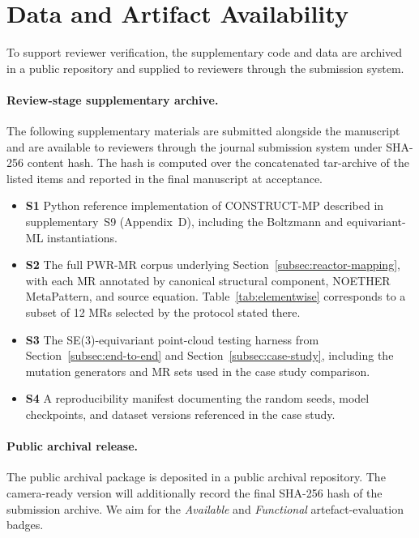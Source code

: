 \documentclass[acmsmall,screen,review]{acmart}
\begin{document}
\section{Data and Artifact Availability}
\label{subsec:artefact}

To support reviewer verification, the supplementary code and data are archived
in a public repository and supplied to reviewers through the submission system.

\paragraph{Review-stage supplementary archive.} The following supplementary materials are submitted alongside the manuscript and are available to reviewers through the journal submission system under SHA-256 content hash. The hash is computed over the concatenated tar-archive of the listed items and reported in the final manuscript at acceptance.
\begin{itemize}
    \item \textbf{S1} Python reference implementation of CONSTRUCT-MP described in supplementary~S9 (Appendix~D), including the Boltzmann and equivariant-ML instantiations.
    \item \textbf{S2} The full PWR-MR corpus underlying Section~\ref{subsec:reactor-mapping}, with each MR annotated by canonical structural component, NOETHER MetaPattern, and source equation. Table~\ref{tab:elementwise} corresponds to a subset of 12 MRs selected by the protocol stated there.
    \item \textbf{S3} The SE(3)-equivariant point-cloud testing harness from Section~\ref{subsec:end-to-end} and Section~\ref{subsec:case-study}, including the mutation generators and MR sets used in the case study comparison.
    \item \textbf{S4} A reproducibility manifest documenting the random seeds, model checkpoints, and dataset versions referenced in the case study.
\end{itemize}

\paragraph{Public archival release.} The public archival package is deposited
in a public archival repository. The camera-ready version will additionally record the final SHA-256 hash of the
submission archive. We aim for the \emph{Available} and \emph{Functional}
artefact-evaluation badges.
\end{document}
